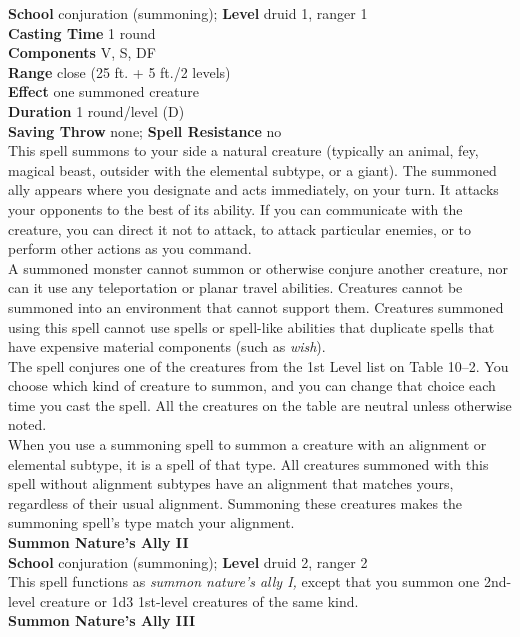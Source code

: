 \textbf{School} conjuration (summoning); \textbf{Level} druid 1, ranger 1\\
\textbf{Casting Time} 1 round\\
\textbf{Components} V, S, DF\\
\textbf{Range} close (25 ft. + 5 ft./2 levels)\\
\textbf{Effect} one summoned creature\\
\textbf{Duration} 1 round/level (D)\\
\textbf{Saving Throw} none; \textbf{Spell Resistance} no\\
This spell summons to your side a natural creature (typically an animal, fey, magical beast, outsider with the elemental subtype, or a giant). The summoned ally appears where you designate and acts immediately, on your turn. It attacks your opponents to the best of its ability. If you can communicate with the creature, you can direct it not to attack, to attack particular enemies, or to perform other actions as you command.\\
A summoned monster cannot summon or otherwise conjure another creature, nor can it use any teleportation or planar travel abilities. Creatures cannot be summoned into an environment that cannot support them. Creatures summoned using this spell cannot use spells or spell-like abilities that duplicate spells that have expensive material components (such as \textit{wish}).\\
The spell conjures one of the creatures from the 1st Level list on Table 10–2. You choose which kind of creature to summon, and you can change that choice each time you cast the spell. All the creatures on the table are neutral unless otherwise noted.\\
When you use a summoning spell to summon a creature with an alignment or elemental subtype, it is a spell of that type. All creatures summoned with this spell without alignment subtypes have an alignment that matches yours, regardless of their usual alignment. Summoning these creatures makes the summoning spell's type match your alignment. \\
\textbf{Summon Nature's Ally II}\\
\textbf{School} conjuration (summoning); \textbf{Level} druid 2, ranger 2\\
This spell functions as \textit{summon nature's ally I, }except that you summon one 2nd-level creature or 1d3 1st-level creatures of the same kind.\\
\textbf{Summon Nature's Ally III}\\
